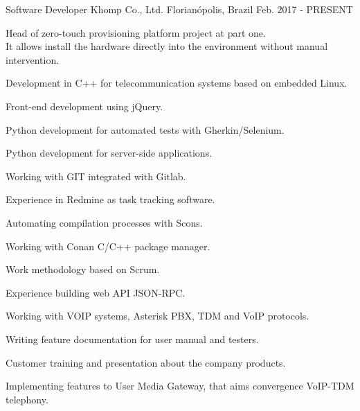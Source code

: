 

\begin{cventries}

  \cventry
    {Software Developer} %
    {Khomp Co., Ltd.} %
    {Florianópolis, Brazil} %
    {Feb. 2017 - PRESENT} %
    {
      \begin{cvitems} %
        \item {Head of zero-touch provisioning platform project at part one. \\
	It allows install the hardware directly into the environment without manual intervention.}
        \item {Development in C++ for telecommunication systems based on embedded Linux.}
        \item {Front-end development using jQuery.}
        \item {Python development for automated tests with Gherkin/Selenium.}
        \item {Python development for server-side applications.}
        \item {Working with GIT integrated with Gitlab.}
        \item {Experience in Redmine as task tracking software.}
        \item {Automating compilation processes with Scons.}
        \item {Working with Conan C/C++ package manager.}
        \item {Work methodology based on Scrum.}
        \item {Experience building web API JSON-RPC.}
        \item {Working with VOIP systems, Asterisk PBX, TDM and VoIP protocols.}
        \item {Writing feature documentation for user manual and testers.}
        \item {Customer training and presentation about the company products.}
        \item {Implementing features to User Media Gateway, that aims convergence VoIP-TDM telephony.}
      \end{cvitems}
    }


\end{cventries}
